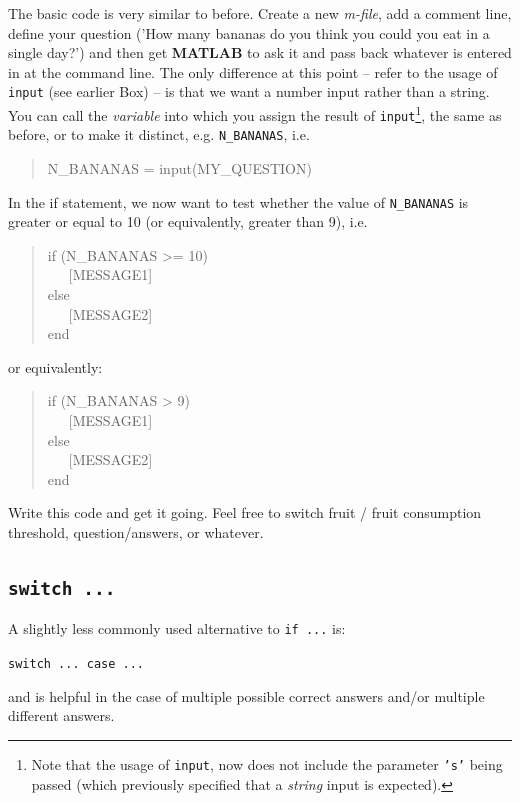 \documentclass{tufte-book} %
\newenvironment{docspec}{\begin{quotation}\ttfamily\parskip0pt\parindent0pt\ignorespaces}{\end{quotation}}
\begin{document}
The basic code is very similar to before. Create a new \textit{m-file}, add a comment line, define your question ('How many bananas do you think you could you eat in a single day?') and then get \textbf{MATLAB} to ask it and pass back whatever is entered in at the command line. The only difference at this point -- refer to the usage of \texttt{input} (see earlier Box) -- is that we want a number input rather than a string. You can call the \textit{variable} into which you assign the result of \texttt{input}\footnote{Note that the usage of \texttt{input}, now does not include the parameter \texttt{'s'} being passed (which previously specified that a \textit{string} input is expected).}, the same as before, or to make it distinct, e.g. \texttt{N\_BANANAS}, i.e.
\begin{docspec}
N\_BANANAS = input(MY\_QUESTION)
\end{docspec}

In the if statement, we now want to test whether the value of \texttt{N\_BANANAS} is greater or equal to 10 (or equivalently, greater than 9), i.e.
\begin{docspec}
if (N\_BANANAS >= 10)
\\ \ \ \ [MESSAGE1]
\\else
\\ \ \ \ [MESSAGE2]
\\end
\end{docspec}
or equivalently:
\begin{docspec}
if (N\_BANANAS > 9)
\\ \ \ \ [MESSAGE1]
\\else
\\ \ \ \ [MESSAGE2]
\\end
\end{docspec}

Write this code and get it going. Feel free to switch fruit / fruit consumption threshold, question/answers, or whatever.


\subsection{\texttt{switch ...}}

A slightly less commonly used alternative to \texttt{if ...} is:

\texttt{switch ... case ...} 

\noindent and is helpful in the case of multiple possible correct answers and/or multiple different answers.
\end{document}
